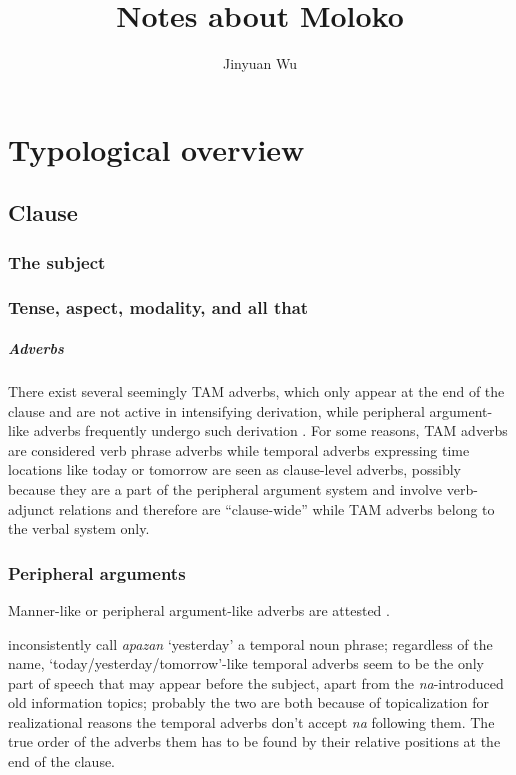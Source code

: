 \documentclass[a4paper, oneside, 12pt]{report}
\title{Notes about Moloko}
\author{Jinyuan Wu}
\newcommand*{\citepage}[1]{p.~{#1}}
\newcommand*{\citepages}[1]{pp.~{#1}}
\newcommand{\form}[1]{\emph{#1}}
\newcommand{\translate}[1]{`#1'}
\begin{document}
\automath

\maketitle

\chapter{Typological overview}

\section{Clause}

\subsection{The subject}

\subsection{Tense, aspect, modality, and all that}

\paragraph*{Adverbs}
There exist several seemingly TAM adverbs,
which only appear at the end of the clause 
and are not active in intensifying derivation,
while peripheral argument-like adverbs frequently undergo such derivation
\citep[\citepages{110-111}, (109-111)]{friesen2017grammar}.
For some reasons, TAM adverbs are considered verb phrase adverbs 
while temporal adverbs expressing time locations like today or tomorrow 
are seen as clause-level adverbs,
possibly because they are a part of the peripheral argument system 
and involve verb-adjunct relations and therefore are ``clause-wide''
while TAM adverbs belong to the verbal system only.

\subsection{Peripheral arguments}

Manner-like or peripheral argument-like adverbs 
are attested \citep[\citepage{110}, (106-108)]{friesen2017grammar}.


\citet[\citepage308]{friesen2017grammar} 
inconsistently call \form{apazan} \translate{yesterday} 
a temporal noun phrase; 
regardless of the name, 
\translate{today/yesterday/tomorrow}-like temporal adverbs 
seem to be the only part of speech that may appear before the subject,
apart from the \form{na}-introduced old information topics;
probably the two are both because of topicalization
for realizational reasons the temporal adverbs don't accept \form{na} following them.
The true order of the adverbs them has to be found 
by their relative positions at the end of the clause.
\end{document}
